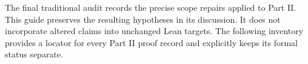 The final traditional audit records the precise scope repairs applied to Part II. This guide preserves the resulting hypotheses in its discussion. It does not incorporate altered claims into unchanged Lean targets. The following inventory provides a locator for every Part II proof record and explicitly keeps its formal status separate.
